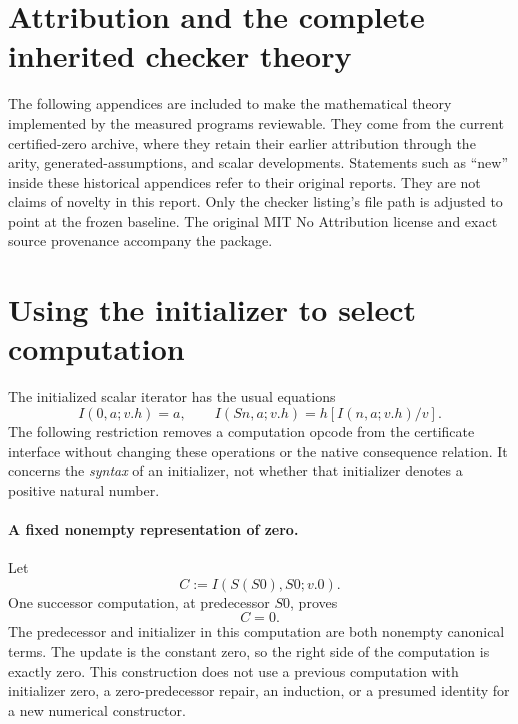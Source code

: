\documentclass[11pt,letterpaper]{article}
\theoremstyle{definition}\newtheorem{definition}[theorem]{Definition}
\theoremstyle{remark}\newtheorem{remark}[theorem]{Remark}
\begin{document}
\clearpage
\appendix
\section{Attribution and the complete inherited checker theory}
The following appendices are included to make the mathematical theory
implemented by the measured programs reviewable. They come from the
current certified-zero archive, where they retain their earlier
attribution through the arity, generated-assumptions, and scalar
developments. Statements such as ``new'' inside these historical
appendices refer to their original reports. They are not claims of
novelty in this report. Only the checker listing's file path is adjusted
to point at the frozen baseline. The original MIT No Attribution
license and exact source provenance accompany the package.



\section{Using the initializer to select computation}
\label{sec:seed-dispatch}

The initialized scalar iterator has the usual equations
\[
 I(0,a;v.h)=a,\qquad
 I(Sn,a;v.h)=h[I(n,a;v.h)/v].
 \tag{I0, IS}
\]
The following restriction removes a computation opcode from the
certificate interface without changing these operations or the native
consequence relation.  It concerns the \emph{syntax} of an initializer,
not whether that initializer denotes a positive natural number.

\paragraph{A fixed nonempty representation of zero.}
Let
\[
               C:=I(S(S0),S0;v.0).
 \tag{Auxiliary zero}\label{eq:dispatch-zero-term}
\]
One successor computation, at predecessor $S0$, proves
\[
                              C=0.\label{eq:dispatch-zero}
 \tag{Zero certificate}
\]
The predecessor and initializer in this computation are both nonempty
canonical terms.  The update is the constant zero, so the right side of
the computation is exactly zero.  This construction does not use a
previous computation with initializer zero, a zero-predecessor repair,
an induction, or a presumed identity for a new numerical constructor.
\end{document}

